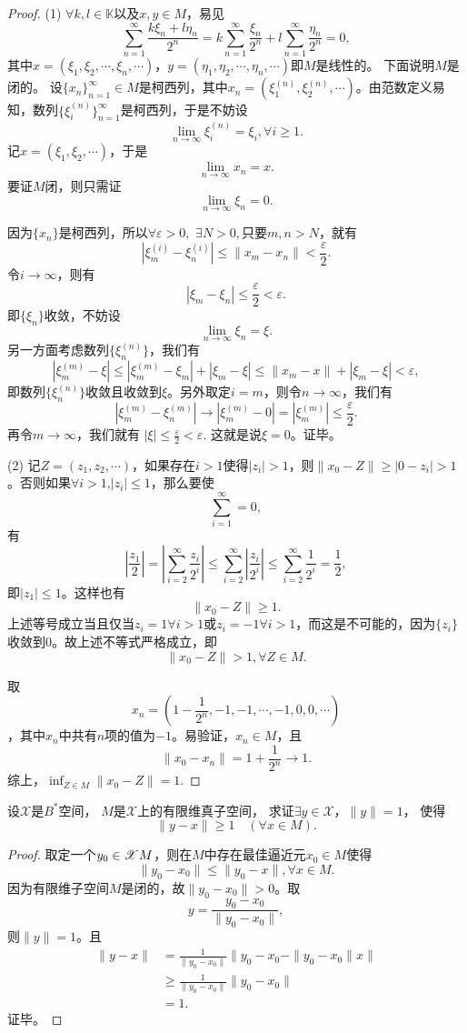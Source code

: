 \begin{proof}
(1) $\forall k,l\in\mathbb{K}$以及$x,y\in M$，易见
$$\sum_{n=1}^{\infty}\frac{k\xi_n+l\eta_n}{2^n}=k\sum_{n=1}^{\infty}\frac{\xi_n}{2^n}+l\sum_{n=1}^{\infty}\frac{\eta_n}{2^n}=0,$$
其中$x=(\xi_1,\xi_2,\cdots,\xi_n,\cdots)$，$y=(\eta_1,\eta_2,\cdots,\eta_n,\cdots)$即$M$是线性的。
下面说明$M$是闭的。
设$\{x_n\}_{n=1}^{\infty}\in M$是柯西列，其中$x_n=(\xi^{(n)}_1,\xi^{(n)}_2,\cdots)$。由范数定义易知，数列$\{\xi_i^{(n)}\}_{n=1}^{\infty}$是柯西列，于是不妨设
$$\lim_{n\to\infty}\xi_i^{(n)}=\xi_i,\forall i\geq1.$$
记$x=(\xi_1,\xi_2,\cdots)$，于是
$$\lim_{n\to\infty}x_n=x.$$
要证$M$闭，则只需证$$\lim_{n\to\infty}\xi_n=0.$$

因为$\{x_n\}$是柯西列，所以$\forall\varepsilon>0,$ $\exists N>0,$只要$m,n>N$，就有
$$|\xi_m^{(i)}-\xi_n^{(i)}|\leq\|x_m-x_n\|<\frac{\varepsilon}{2}.$$
令$i\to\infty$，则有
$$|\xi_m-\xi_n|\leq\frac{\varepsilon}2<\varepsilon.$$
即$\{\xi_n\}$收敛，不妨设
$$\lim_{n\to\infty}\xi_n=\xi.$$
另一方面考虑数列$\{\xi_n^{(n)}\}$，我们有
$$|\xi_m^{(m)}-\xi|\leq|\xi_m^{(m)}-\xi_m|+|\xi_m-\xi|\leq\|x_m-x\|+|\xi_m-\xi|<\varepsilon,$$
即数列$\{\xi_n^{(n)}\}$收敛且收敛到$\xi$。另外取定$i=m$，则令$n\to\infty$，我们有$$|\xi_m^{(m)}-\xi_n^{(m)}|\to|\xi_m^{(m)}-0|=|\xi_m^{(m)}|\leq\frac{\varepsilon}2.$$再令$m\to\infty$，我们就有
$|\xi|\leq\frac{\varepsilon}{2}<\varepsilon.$
这就是说$\xi=0$。证毕。

(2) 记$Z=(z_1,z_2,\cdots)$，如果存在$i>1$使得$|z_i|>1$，则$\|x_0-Z\|\geq|0-z_i|>1$。否则如果$\forall i>1$,$|z_i|\leq1$，那么要使
$$\sum_{i=1}^{\infty}=0,$$
有$$|\frac{z_1}{2}|=|\sum_{i=2}^{\infty}\frac{z_i}{2^i}|\leq\sum_{i=2}^{\infty}|\frac{z_i}{2^i}|\leq\sum_{i=2}^{\infty}\frac{1}{2^i}=\frac{1}{2},$$即$|z_1|\leq1$。这样也有
$$\|x_0-Z\|\geq1.$$
上述等号成立当且仅当$z_i=1\forall i>1$或$z_i=-1\forall i>1$，而这是不可能的，因为$\{z_i\}$收敛到$0$。故上述不等式严格成立，即$$\|x_0-Z\|>1,\forall Z\in M.$$

取$$x_n=(1-\frac{1}{2^n},-1,-1,\cdots,-1,0,0,\cdots)$$，其中$x_n$中共有$n$项的值为$-1$。易验证，$x_n\in M$，且
$$\|x_0-x_n\|=1+\frac{1}{2^n}\to1.$$
综上，$\inf_{Z\in M}\|x_0-Z\|=1.$
\end{proof}

\begin{exercise}
设$\mathscr{X}$是$B^*$空间，
$M$是$\mathscr{X}$上的有限维真子空间，
求证$\exists y\in\mathscr{X}$，$\|y\|=1$，
使得
$$\|y-x\|\geq1\quad(\forall x\in M).$$
\end{exercise}

\begin{proof}
  取定一个$y_0\in\mathscr{X}\\M$，则在$M$中存在最佳逼近元$x_0\in M$使得$$\|y_0-x_0\|\leq\|y_0-x\|,\forall x\in M.$$因为有限维子空间$M$是闭的，故$\|y_0-x_0\|>0$。取
  $$y=\frac{y_0-x_0}{\|y_0-x_0\|},$$
  则$\|y\|=1$。且
  \begin{align*}
  \|y-x\|&=\frac{1}{\|y_0-x_0\|}\|y_0-x_0-\|y_0-x_0\|x\|\\
  &\geq\frac{1}{\|y_0-x_0\|}\|y_0-x_0\|\\
  &=1.
  \end{align*} 
  证毕。 
\end{proof}


